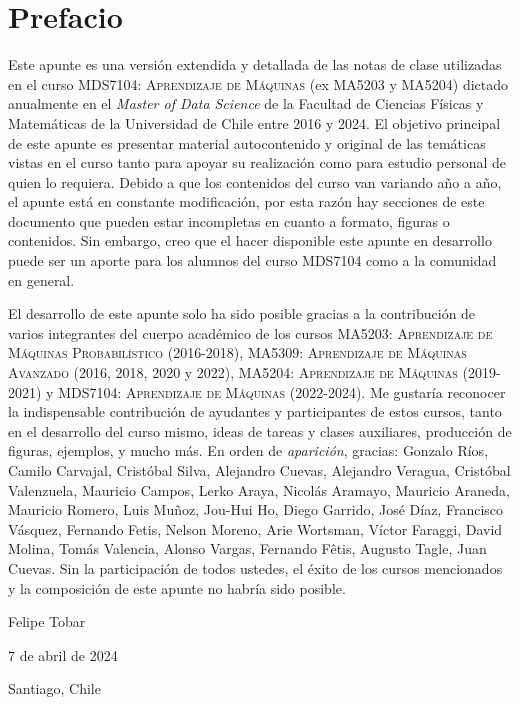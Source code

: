 \newpage
\section*{Prefacio}
Este apunte es una versión extendida y detallada de las notas de clase utilizadas en el curso \textsc{MDS7104: Aprendizaje de Máquinas} (ex MA5203 y MA5204) dictado anualmente en el \emph{Master of Data Science} de la Facultad de Ciencias Físicas y Matemáticas de la  Universidad de Chile entre 2016 y 2024. El objetivo principal de este apunte es presentar material autocontenido y original de las temáticas vistas en el curso tanto para apoyar su realización como para estudio personal de quien lo requiera. Debido a que los contenidos del curso van variando año a año, el apunte está en constante modificación, por esta razón hay secciones de este documento que pueden estar incompletas en cuanto a formato, figuras o contenidos. Sin embargo, creo que el hacer disponible este apunte en desarrollo puede ser un aporte para los alumnos del curso MDS7104 como a la comunidad en general.

El desarrollo de este apunte solo ha sido posible gracias a la contribución de varios integrantes del cuerpo académico de los cursos \textsc{MA5203: Aprendizaje de Máquinas Probabilístico} (2016-2018), \textsc{MA5309: Aprendizaje de Máquinas Avanzado} (2016, 2018, 2020 y 2022), \textsc{MA5204: Aprendizaje de Máquinas} (2019-2021) y \textsc{MDS7104: Aprendizaje de Máquinas} (2022-2024). Me gustaría reconocer la indispensable contribución de ayudantes y participantes de estos cursos, tanto en el desarrollo del curso mismo, ideas de tareas y clases auxiliares, producción de figuras, ejemplos, y mucho más. En orden de \emph{aparición}, gracias: 
Gonzalo Ríos, 
Camilo Carvajal,
Cristóbal Silva, 
Alejandro Cuevas, 
Alejandro Veragua, 
Cristóbal Valenzuela, 
Mauricio Campos, 
Lerko Araya, 
Nicolás Aramayo, 
Mauricio Araneda, 
Mauricio Romero, 
Luis Muñoz, 
Jou-Hui Ho, 
Diego Garrido, 
José Díaz, 
Francisco Vásquez, 
Fernando Fetis, 
Nelson Moreno, 
Arie Wortsman, 
Víctor Faraggi, 
David Molina, 
Tomás Valencia, 
Alonso Vargas, 
Fernando F\^etis, 
Augusto Tagle, 
Juan Cuevas.
Sin la participación de todos ustedes, el éxito de los cursos mencionados y la composición de este apunte no habría sido posible.





\bigskip
\begin{flushright}
  Felipe Tobar\par
  7 de abril de 2024\par
  Santiago, Chile
\end{flushright}
\newpage

